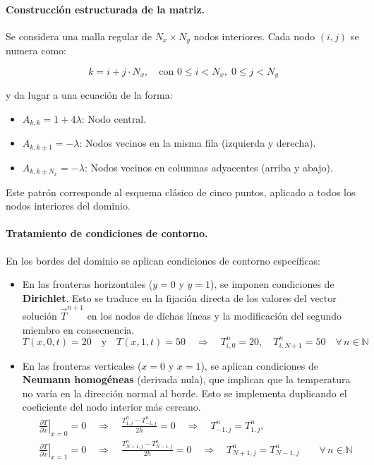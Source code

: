\documentclass{article}
\begin{document}
\paragraph{Construcción estructurada de la matriz.} Se considera una malla regular de $N_x \times N_y$ nodos interiores. Cada nodo $(i,j)$ se numera como:

$$
k = i + j \cdot N_x, \quad \text{con } 0 \leq i < N_x, \; 0 \leq j < N_y
$$

y da lugar a una ecuación de la forma:

\begin{itemize}
    \item $A_{k,k} = 1 + 4\lambda$: Nodo central.
    \item $A_{k,k \pm 1} = -\lambda$: Nodos vecinos en la misma fila (izquierda y derecha).
    \item $A_{k,k \pm N_x} = -\lambda$: Nodos vecinos en columnas adyacentes (arriba y abajo).
\end{itemize}

Este patrón corresponde al esquema clásico de cinco puntos, aplicado a todos los nodos interiores del dominio.

\paragraph{Tratamiento de condiciones de contorno.}

En los bordes del dominio se aplican condiciones de contorno específicas:

\begin{itemize}
    \item En las fronteras horizontales ($y = 0$ y $y = 1$), se imponen condiciones de \textbf{Dirichlet}. Esto se traduce en la fijación directa de los valores del vector solución $\vec{T}^{n+1}$ en los nodos de dichas líneas y la modificación del segundo miembro en consecuencia.
    $$
    T(x, 0, t) = 20 \quad \text{y} \quad T(x, 1, t) = 50 
    \quad \Longrightarrow \quad 
    T_{i,0}^n = 20, \quad T_{i,N+1}^n = 50 \quad \forall\, n \in \mathbb{N}
    $$
    \item En las fronteras verticales ($x = 0$ y $x = 1$), se aplican condiciones de \textbf{Neumann homogéneas} (derivada nula), que implican que la temperatura no varía en la dirección normal al borde. Esto se implementa duplicando el coeficiente del nodo interior más cercano.
    $$
    \begin{aligned}
    &\left. \frac{\partial T}{\partial x} \right|_{x=0} = 0 
    \quad \Longrightarrow \quad 
    \frac{T_{1,j}^n - T_{-1,j}^n}{2h} = 0 
    \quad \Longrightarrow \quad 
    T_{-1,j}^n = T_{1,j}^n, \\
    &\left. \frac{\partial T}{\partial x} \right|_{x=1} = 0 
    \quad \Longrightarrow \quad 
    \frac{T_{N+1,j}^n - T_{N-1,j}^n}{2h} = 0 
    \quad \Longrightarrow \quad 
    T_{N+1,j}^n = T_{N-1,j}^n 
    \qquad \forall\, n \in \mathbb{N}
    \end{aligned}
    $$
\end{itemize}
\end{document}

